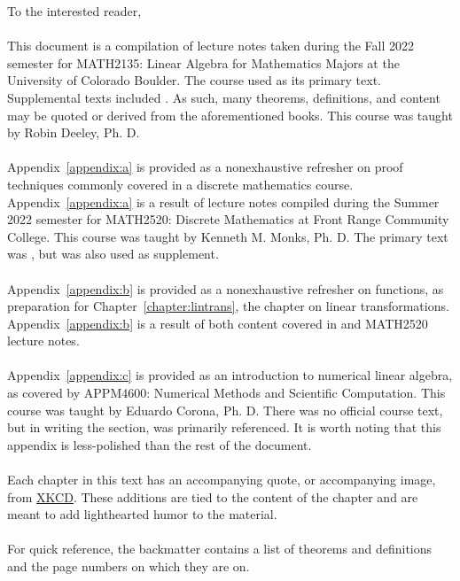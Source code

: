 To the interested reader,
\\
\\
This document is a compilation of lecture notes taken during the Fall 2022 semester for MATH2135: Linear Algebra for Mathematics Majors at the University of Colorado Boulder. The course used \cite{andrilli2016linear} as its primary text. Supplemental texts included \cite{treil2017linear,axler2024linear,olver2006applied}. As such, many theorems, definitions, and content may be quoted or derived from the aforementioned books. This course was taught by Robin Deeley, Ph. D.
\\
\\
Appendix~\ref{appendix:a} is provided as a nonexhaustive refresher on proof techniques commonly covered in a discrete mathematics course. Appendix~\ref{appendix:a} is a result of lecture notes compiled during the Summer 2022 semester for MATH2520: Discrete Mathematics at Front Range Community College. This course was taught by Kenneth M. Monks, Ph. D. The primary text was \cite{levin2021discrete}, but \cite{hammack2018book} was also used as supplement.
\\
\\
Appendix~\ref{appendix:b} is provided as a nonexhaustive refresher on functions, as preparation for Chapter~\ref{chapter:lintrans}, the chapter on linear transformations. Appendix~\ref{appendix:b} is a result of both content covered in \cite{andrilli2016linear} and MATH2520 lecture notes.
\\
\\
Appendix~\ref{appendix:c} is provided as an introduction to numerical linear algebra, as covered by APPM4600: Numerical Methods and Scientific Computation. This course was taught by Eduardo Corona, Ph. D. There was no official course text, but in writing the section, \cite{olver2006applied} was primarily referenced. It is worth noting that this appendix is less-polished than the rest of the document.
\\
\\
Each chapter in this text has an accompanying quote, or accompanying image, from \href{https://xkcd.com/license.html}{XKCD}. These additions are tied to the content of the chapter and are meant to add lighthearted humor to the material. 
\\
\\
For quick reference, the backmatter contains a list of theorems and definitions and the page numbers on which they are on.
\\
\\
